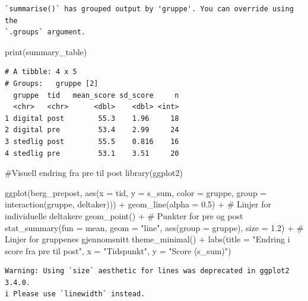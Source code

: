 \documentclass[
  letterpaper,
  DIV=11,
  numbers=noendperiod]{scrreprt}
\newenvironment{Shaded}{\begin{snugshade}}{\end{snugshade}}
\newcommand{\AttributeTok}[1]{\textcolor[rgb]{0.40,0.45,0.13}{#1}}
\newcommand{\CommentTok}[1]{\textcolor[rgb]{0.37,0.37,0.37}{#1}}
\newcommand{\FloatTok}[1]{\textcolor[rgb]{0.68,0.00,0.00}{#1}}
\newcommand{\FunctionTok}[1]{\textcolor[rgb]{0.28,0.35,0.67}{#1}}
\newcommand{\NormalTok}[1]{\textcolor[rgb]{0.00,0.23,0.31}{#1}}
\newcommand{\SpecialCharTok}[1]{\textcolor[rgb]{0.37,0.37,0.37}{#1}}
\newcommand{\StringTok}[1]{\textcolor[rgb]{0.13,0.47,0.30}{#1}}
\begin{document}
\begin{verbatim}
`summarise()` has grouped output by 'gruppe'. You can override using the
`.groups` argument.
\end{verbatim}

\begin{Shaded}
\begin{Highlighting}[]
\FunctionTok{print}\NormalTok{(summary\_table)}
\end{Highlighting}
\end{Shaded}

\begin{verbatim}
# A tibble: 4 x 5
# Groups:   gruppe [2]
  gruppe  tid   mean_score sd_score     n
  <chr>   <chr>      <dbl>    <dbl> <int>
1 digital post        55.3    1.96     18
2 digital pre         53.4    2.99     24
3 stedlig post        55.5    0.816    16
4 stedlig pre         53.1    3.51     20
\end{verbatim}

\begin{Shaded}
\begin{Highlighting}[]
\CommentTok{\#Visuell endring fra pre til post}
\FunctionTok{library}\NormalTok{(ggplot2)}

\FunctionTok{ggplot}\NormalTok{(berg\_prepost, }\FunctionTok{aes}\NormalTok{(}\AttributeTok{x =}\NormalTok{ tid, }\AttributeTok{y =}\NormalTok{ s\_sum, }\AttributeTok{color =}\NormalTok{ gruppe, }\AttributeTok{group =} \FunctionTok{interaction}\NormalTok{(gruppe, deltaker))) }\SpecialCharTok{+}
  \FunctionTok{geom\_line}\NormalTok{(}\AttributeTok{alpha =} \FloatTok{0.5}\NormalTok{) }\SpecialCharTok{+}  \CommentTok{\# Linjer for individuelle deltakere}
  \FunctionTok{geom\_point}\NormalTok{() }\SpecialCharTok{+}  \CommentTok{\# Punkter for pre og post}
  \FunctionTok{stat\_summary}\NormalTok{(}\AttributeTok{fun =}\NormalTok{ mean, }\AttributeTok{geom =} \StringTok{"line"}\NormalTok{, }\FunctionTok{aes}\NormalTok{(}\AttributeTok{group =}\NormalTok{ gruppe), }\AttributeTok{size =} \FloatTok{1.2}\NormalTok{) }\SpecialCharTok{+}  \CommentTok{\# Linjer for gruppenes gjennomsnitt}
  \FunctionTok{theme\_minimal}\NormalTok{() }\SpecialCharTok{+}
  \FunctionTok{labs}\NormalTok{(}\AttributeTok{title =} \StringTok{"Endring i score fra pre til post"}\NormalTok{, }\AttributeTok{x =} \StringTok{"Tidspunkt"}\NormalTok{, }\AttributeTok{y =} \StringTok{"Score (s\_sum)"}\NormalTok{)}
\end{Highlighting}
\end{Shaded}

\begin{verbatim}
Warning: Using `size` aesthetic for lines was deprecated in ggplot2 3.4.0.
i Please use `linewidth` instead.
\end{verbatim}
\end{document}
